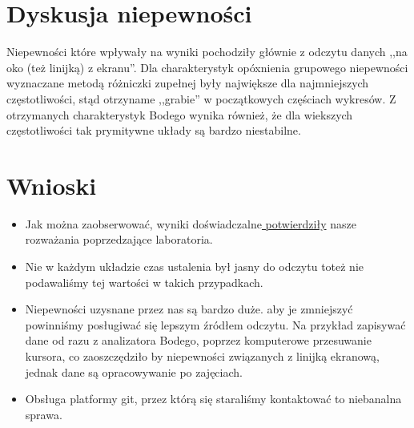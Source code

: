 \documentclass[a4paper,11pt]{article}
\begin{document}
\section{Dyskusja niepewności}

Niepewności które wpływały na wyniki pochodziły głównie z odczytu danych ,,na oko (też linijką) z ekranu''. Dla charakterystyk opóxnienia grupowego niepewności wyznaczane metodą różniczki zupełnej były największe dla najmniejszych częstotliwości, stąd otrzyname ,,grabie'' w początkowych częściach wykresów. Z otrzymanych charakterystyk Bodego wynika również, że dla wiekszych częstotliwości tak prymitywne układy są bardzo niestabilne.  

\section{Wnioski}


\begin{itemize}
  \item Jak można zaobserwować,  wyniki doświadczalne\underline{ potwierdziły} nasze rozważania poprzedzające laboratoria.
  \item Nie w każdym układzie czas ustalenia był jasny do odczytu toteż nie podawaliśmy tej wartości w takich przypadkach.  
  \item Niepewności uzysnane przez nas są bardzo duże. aby je zmniejszyć powinniśmy posługiwać się lepszym źródłem odczytu. Na przykład zapisywać dane od razu z analizatora Bodego, poprzez komputerowe przesuwanie kursora, co zaoszczędziło by niepewności związanych z linijką ekranową, jednak dane są opracowywanie po zajęciach.
  \item Obsługa platformy git, przez którą się staraliśmy kontaktować to niebanalna sprawa.
\end{itemize}
\end{document}
